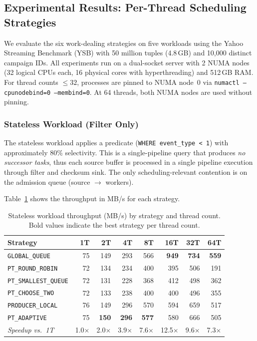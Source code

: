 \subsection{Experimental Results: Per-Thread Scheduling Strategies}
\label{sec:scheduling-results}

We evaluate the six work-dealing strategies on five workloads using the Yahoo Streaming Benchmark (YSB) with 50 million tuples (4.8\,GB) and 10,000 distinct campaign IDs.
All experiments run on a dual-socket server with 2 NUMA nodes (32 logical CPUs each, 16 physical cores with hyperthreading) and 512\,GB RAM.
For thread counts $\leq 32$, processes are pinned to NUMA node~0 via \texttt{numactl --cpunodebind=0 --membind=0}.
At 64 threads, both NUMA nodes are used without pinning.

\subsubsection{Stateless Workload (Filter Only)}

The stateless workload applies a predicate (\texttt{WHERE event\_type < 1}) with approximately 80\% selectivity.
This is a single-pipeline query that produces \emph{no successor tasks}, thus each source buffer is processed in a single pipeline execution through filter and checksum sink.
The only scheduling-relevant contention is on the admission queue (source $\rightarrow$ workers).

Table~\ref{tab:stateless-strategies} shows the throughput in MB/s for each strategy.

\begin{table}[h]
\centering
\caption{Stateless workload throughput (MB/s) by strategy and thread count. Bold values indicate the best strategy per thread count.}
\label{tab:stateless-strategies}
\begin{tabular}{l|rrrrrrr}
\hline
\textbf{Strategy} & \textbf{1T} & \textbf{2T} & \textbf{4T} & \textbf{8T} & \textbf{16T} & \textbf{32T} & \textbf{64T} \\
\hline
\texttt{GLOBAL\_QUEUE}      & 75 & 149 & 293 & 566 & \textbf{949} & \textbf{734} & \textbf{559} \\
\texttt{PT\_ROUND\_ROBIN}   & 72 & 134 & 234 & 400 & 395 & 506 & 191 \\
\texttt{PT\_SMALLEST\_QUEUE}& 72 & 131 & 228 & 368 & 412 & 498 & 362 \\
\texttt{PT\_CHOOSE\_TWO}    & 72 & 133 & 238 & 400 & 400 & 496 & 355 \\
\texttt{PRODUCER\_LOCAL}    & 76 & 149 & 296 & 570 & 594 & 659 & 517 \\
\texttt{PT\_ADAPTIVE}       & 75 & \textbf{150} & \textbf{296} & \textbf{577} & 580 & 666 & 505 \\
\hline
\textit{Speedup vs.\ 1T}   & 1.0$\times$ & 2.0$\times$ & 3.9$\times$ & 7.6$\times$ & 12.5$\times$ & 9.6$\times$ & 7.3$\times$ \\
\hline
\end{tabular}
\end{table}

